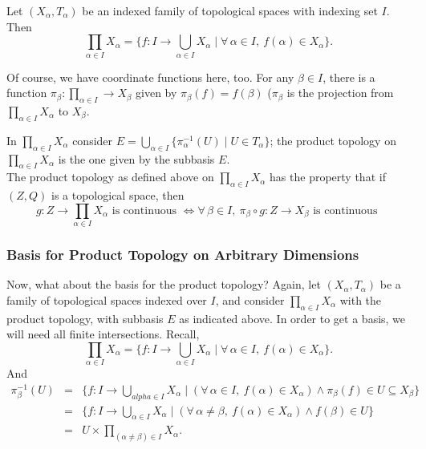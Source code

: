 \documentclass[12pt]{report}
\newcommand{\exercise}{ \noindent{\sc Exercise }\hspace{5pt} }
\newcommand{\fall}{\forall\,}
\newcommand{\unionover}[2]{\bigcup_{#1 \in #2 }}
\newcommand{\productover}[2]{\prod_{#1 \in #2}}
\newcommand{\inv}[1]{#1^{-1}}
\begin{document}
Let $(X_\alpha, T_\alpha)$ be an indexed family of topological spaces with
indexing set $I$. Then 
\begin{displaymath}
\productover{\alpha}{I}X_\alpha = \{f: I \rightarrow
\unionover{\alpha}{I}X_\alpha \mid \fall\alpha \in I,\ f(\alpha) \in
X_\alpha\}.
\end{displaymath} 

Of course, we have coordinate functions here, too.
For any $\beta \in I$, there is a function $\pi_\beta:
\productover{\alpha}{I}\rightarrow X_\beta$ given by $\pi_\beta(f) =
f(\beta)$ ($\pi_\beta$ is the projection from $\productover{\alpha}{I}X_\alpha$
to $X_\beta$. 

In $\productover{\alpha}{I}X_\alpha$ consider 
$E = \unionover{\alpha}{I}\{\inv{\pi_\alpha}(U) \mid U \in T_\alpha\}$; the
product topology on $\productover{\alpha}{I}X_\alpha$ is the one given by the
subbasis $E$. \\

\exercise The product topology as defined above on
$\productover{\alpha}{I}X_\alpha$ has the property that if $(Z,Q)$ is a
topological space, then
\begin{displaymath}
g: Z \rightarrow \productover{\alpha}{I}X_\alpha \textrm{ is continuous } \iff
\fall \beta \in I,\ \pi_\beta \circ g : Z \rightarrow X_\beta \textrm{ is 
continuous }
\end{displaymath}

\subsubsection{Basis for Product Topology on Arbitrary Dimensions}

Now, what about the basis for the product topology? Again, let $(X_\alpha,
T_\alpha)$ be a family of topological spaces indexed over $I$, and consider 
$\productover{\alpha}{I}X_\alpha$ with the product topology, with subbasis $E$
as indicated above. In order to get a basis, we will need all finite
intersections. Recall,
\begin{displaymath}
\productover{\alpha}{I}X_\alpha = \{f:I\rightarrow
\unionover{\alpha}{I}X_\alpha \mid \fall \alpha \in I,\ f(\alpha) \in
X_\alpha\}.
\end{displaymath}
And
\begin{eqnarray*}
\inv{\pi_\beta}(U) & = & \{f:I\rightarrow \unionover{alpha}{I}X_\alpha \mid
(\fall \alpha \in I,\ f(\alpha) \in X_\alpha) \land \pi_\beta(f) \in U \subseteq
X_\beta\} \\
& = & \{f:I\rightarrow \unionover{\alpha}{I}X_\alpha \mid (\fall \alpha \neq
\beta,\ f(\alpha) \in X_\alpha) \land f(\beta) \in U\} \\
& = &  U \times \productover{(\alpha \neq \beta)}{I}X_\alpha.
\end{eqnarray*}\\
\end{document}
